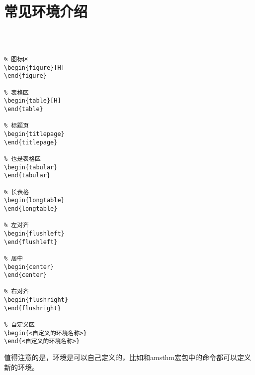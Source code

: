 \part{常见环境介绍}
\begin{lstlisting}[style = LaTeX_TeXworks]
% 正文区（唯一）



% 图标区
\begin{figure}[H]
\end{figure}

% 表格区
\begin{table}[H]
\end{table}

% 标题页
\begin{titlepage}
\end{titlepage}

% 也是表格区
\begin{tabular}
\end{tabular}

% 长表格
\begin{longtable}
\end{longtable}

% 左对齐
\begin{flushleft}
\end{flushleft}

% 居中
\begin{center}
\end{center}

% 右对齐
\begin{flushright}
\end{flushright}

% 自定义区
\begin{<自定义的环境名称>}
\end{<自定义的环境名称>}

\end{lstlisting}

值得注意的是，环境是可以自己定义的，比如和amsthm宏包中的命令都可以定义新的环境。